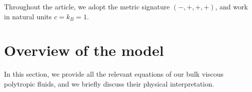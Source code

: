 \documentclass[a4paper, amsfonts, amssymb, amsmath, reprint, showkeys, nofootinbib, twoside,notitlepage,onecolumn]{revtex4-2}
\theoremstyle{definition}
\theoremstyle{theorem}
\theoremstyle{corollary}
\begin{document}

Throughout the article, we adopt the metric signature $(-,+,+,+)$, and work in natural units $c=k_B=1$.


\newpage
\section{Overview of the model}\label{overview}
\vspace{-0.2cm}

In this section, we provide all the relevant equations of our bulk viscous polytropic fluids, and we briefly discuss their physical interpretation.

\vspace{-0.2cm}
\end{document}
